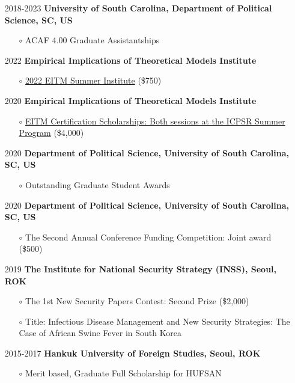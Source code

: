 \documentclass[margin,line]{res}
\begin{document}
\begin{resume}
\begin{itemize}[wide = 0pt] \itemsep 1.5mm
	\item[2018-2023] \textbf{University of South Carolina, Department of Political Science, SC, US}
	\begin{itemize} 
		\item[$\circ$] ACAF 4.00 Graduate Assistantships
	\end{itemize} 
	\item[2022] \textbf{Empirical Implications of Theoretical Models Institute}
	\begin{itemize}
		\item[$\circ$] \href{https://eitminstitute.org/institute/2022/}{2022 EITM Summer Institute} (\$750)
	\end{itemize} 
	\item[2020] \textbf{Empirical Implications of Theoretical Models Institute}
	\begin{itemize}
		\item[$\circ$] \href{https://52.2.147.143/icpsrweb/content/sumprog/scholarships/winners-2020.html}{EITM Certification Scholarships: Both sessions at the ICPSR Summer Program} (\$4,000)
	\end{itemize} 
	\item[2020] \textbf{Department of Political Science, University of South Carolina, SC, US}
	\begin{itemize}
		\item[$\circ$] Outstanding Graduate Student Awards
	\end{itemize} 
	\item[2020] \textbf{Department of Political Science, University of South Carolina, SC, US}
	\begin{itemize}
		\item[$\circ$] The Second Annual Conference Funding Competition: Joint award (\$500)
	\end{itemize} 
	\item[2019] \textbf{The Institute for National Security Strategy (INSS), Seoul, ROK}
	\begin{itemize}\itemsep -1mm 
		\item[$\circ$] The 1st New Security Papers Contest: Second Prize (\$2,000)
		\item[$\circ$] Title: Infectious Disease Management and New Security Strategies: The Case of African Swine Fever in South Korea
	\end{itemize}
	\item[2015-2017] \textbf{Hankuk University of Foreign Studies, Seoul, ROK}
	\begin{itemize} 
		\item[$\circ$] Merit based, Graduate Full Scholarship for HUFSAN
	\end{itemize}
\end{itemize}


\end{resume}
\end{document}
